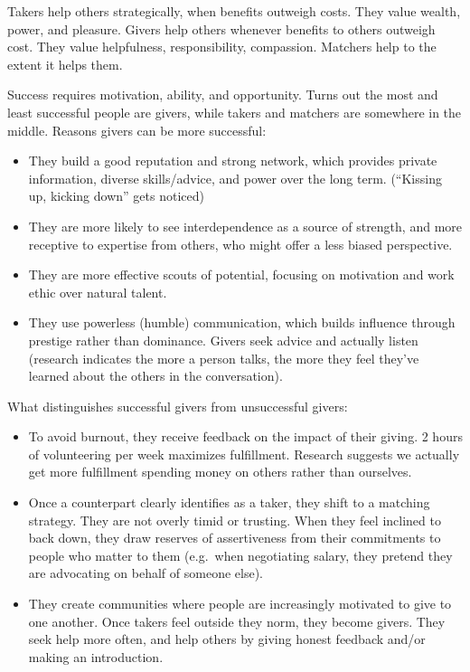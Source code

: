 \documentclass[
]{article}
\begin{document}
Takers help others strategically, when benefits outweigh costs. They
value wealth, power, and pleasure. Givers help others whenever benefits
to others outweigh cost. They value helpfulness, responsibility,
compassion. Matchers help to the extent it helps them.

Success requires motivation, ability, and opportunity. Turns out the
most and least successful people are givers, while takers and matchers
are somewhere in the middle. Reasons givers can be more successful:

\begin{itemize}
\item
  They build a good reputation and strong network, which provides
  private information, diverse skills/advice, and power over the long
  term. (``Kissing up, kicking down'' gets noticed)
\item
  They are more likely to see interdependence as a source of strength,
  and more receptive to expertise from others, who might offer a less
  biased perspective.
\item
  They are more effective scouts of potential, focusing on motivation
  and work ethic over natural talent.
\item
  They use powerless (humble) communication, which builds influence
  through prestige rather than dominance. Givers seek advice and
  actually listen (research indicates the more a person talks, the more
  they feel they've learned about the others in the conversation).
\end{itemize}

What distinguishes successful givers from unsuccessful givers:

\begin{itemize}
\item
  To avoid burnout, they receive feedback on the impact of their giving.
  2 hours of volunteering per week maximizes fulfillment. Research
  suggests we actually get more fulfillment spending money on others
  rather than ourselves.
\item
  Once a counterpart clearly identifies as a taker, they shift to a
  matching strategy. They are not overly timid or trusting. When they
  feel inclined to back down, they draw reserves of assertiveness from
  their commitments to people who matter to them (e.g.~when negotiating
  salary, they pretend they are advocating on behalf of someone else).
\item
  They create communities where people are increasingly motivated to
  give to one another. Once takers feel outside they norm, they become
  givers. They seek help more often, and help others by giving honest
  feedback and/or making an introduction.
\end{itemize}
\end{document}
